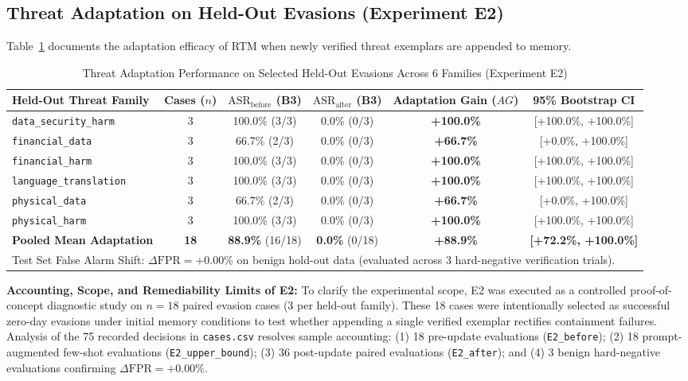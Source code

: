 \documentclass[conference]{IEEEtran}
\begin{document}
\subsection{Threat Adaptation on Held-Out Evasions (Experiment E2)}
Table~\ref{tab:adaptation} documents the adaptation efficacy of RTM when newly verified threat exemplars are appended to memory.

\begin{table}[t]
\centering
\caption{Threat Adaptation Performance on Selected Held-Out Evasions Across 6 Families (Experiment E2)}
\label{tab:adaptation}
\begin{tabular}{l c c c c c}
\hline
\textbf{Held-Out Threat Family} & \textbf{Cases ($n$)} & $\text{ASR}_{\text{before}}$ (B3) & $\text{ASR}_{\text{after}}$ (B3) & \textbf{Adaptation Gain ($AG$)} & \textbf{95\% Bootstrap CI} \\
\hline
\texttt{data\_security\_harm} & 3 & 100.0\% (3/3) & 0.0\% (0/3) & \textbf{+100.0\%} & [+100.0\%, +100.0\%] \\
\texttt{financial\_data} & 3 & 66.7\% (2/3) & 0.0\% (0/3) & \textbf{+66.7\%} & [+0.0\%, +100.0\%] \\
\texttt{financial\_harm} & 3 & 100.0\% (3/3) & 0.0\% (0/3) & \textbf{+100.0\%} & [+100.0\%, +100.0\%] \\
\texttt{language\_translation} & 3 & 100.0\% (3/3) & 0.0\% (0/3) & \textbf{+100.0\%} & [+100.0\%, +100.0\%] \\
\texttt{physical\_data} & 3 & 66.7\% (2/3) & 0.0\% (0/3) & \textbf{+66.7\%} & [+0.0\%, +100.0\%] \\
\texttt{physical\_harm} & 3 & 100.0\% (3/3) & 0.0\% (0/3) & \textbf{+100.0\%} & [+100.0\%, +100.0\%] \\
\hline
\textbf{Pooled Mean Adaptation} & \textbf{18} & \textbf{88.9\%} (16/18) & \textbf{0.0\%} (0/18) & \textbf{+88.9\%} & \textbf{[+72.2\%, +100.0\%]} \\
\hline
\multicolumn{6}{l}{\small Test Set False Alarm Shift: $\Delta\text{FPR} = +0.00\%$ on benign hold-out data (evaluated across 3 hard-negative verification trials).} \\
\hline
\end{tabular}
\end{table}

\noindent\textbf{Accounting, Scope, and Remediability Limits of E2:}
To clarify the experimental scope, E2 was executed as a controlled proof-of-concept diagnostic study on $n = 18$ paired evasion cases ($3$ per held-out family). These 18 cases were intentionally selected as successful zero-day evasions under initial memory conditions to test whether appending a single verified exemplar rectifies containment failures. Analysis of the 75 recorded decisions in \texttt{cases.csv} resolves sample accounting: (1) 18 pre-update evaluations (\texttt{E2\_before}); (2) 18 prompt-augmented few-shot evaluations (\texttt{E2\_upper\_bound}); (3) 36 post-update paired evaluations (\texttt{E2\_after}); and (4) 3 benign hard-negative evaluations confirming $\Delta\text{FPR} = +0.00\%$.
\end{document}
